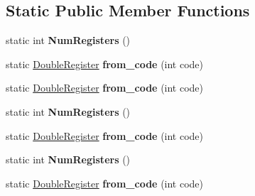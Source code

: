 \subsection*{Static Public Member Functions}
\begin{DoxyCompactItemize}
\item 
static int {\bfseries Num\+Registers} ()\hypertarget{structv8_1_1internal_1_1_double_register_a473c605dec29cbc4b809c58cc6c0c275}{}\label{structv8_1_1internal_1_1_double_register_a473c605dec29cbc4b809c58cc6c0c275}

\item 
static \hyperlink{structv8_1_1internal_1_1_double_register}{Double\+Register} {\bfseries from\+\_\+code} (int code)\hypertarget{structv8_1_1internal_1_1_double_register_abbf1aff5e1ce772545e91fd1a88961da}{}\label{structv8_1_1internal_1_1_double_register_abbf1aff5e1ce772545e91fd1a88961da}

\item 
static \hyperlink{structv8_1_1internal_1_1_double_register}{Double\+Register} {\bfseries from\+\_\+code} (int code)\hypertarget{structv8_1_1internal_1_1_double_register_abbf1aff5e1ce772545e91fd1a88961da}{}\label{structv8_1_1internal_1_1_double_register_abbf1aff5e1ce772545e91fd1a88961da}

\item 
static int {\bfseries Num\+Registers} ()\hypertarget{structv8_1_1internal_1_1_double_register_aca2b5154d072ab12d9fcc732fda7c8fd}{}\label{structv8_1_1internal_1_1_double_register_aca2b5154d072ab12d9fcc732fda7c8fd}

\item 
static \hyperlink{structv8_1_1internal_1_1_double_register}{Double\+Register} {\bfseries from\+\_\+code} (int code)\hypertarget{structv8_1_1internal_1_1_double_register_abbf1aff5e1ce772545e91fd1a88961da}{}\label{structv8_1_1internal_1_1_double_register_abbf1aff5e1ce772545e91fd1a88961da}

\item 
static int {\bfseries Num\+Registers} ()\hypertarget{structv8_1_1internal_1_1_double_register_aca2b5154d072ab12d9fcc732fda7c8fd}{}\label{structv8_1_1internal_1_1_double_register_aca2b5154d072ab12d9fcc732fda7c8fd}

\item 
static \hyperlink{structv8_1_1internal_1_1_double_register}{Double\+Register} {\bfseries from\+\_\+code} (int code)\hypertarget{structv8_1_1internal_1_1_double_register_abbf1aff5e1ce772545e91fd1a88961da}{}\label{structv8_1_1internal_1_1_double_register_abbf1aff5e1ce772545e91fd1a88961da}


\end{DoxyCompactItemize}
